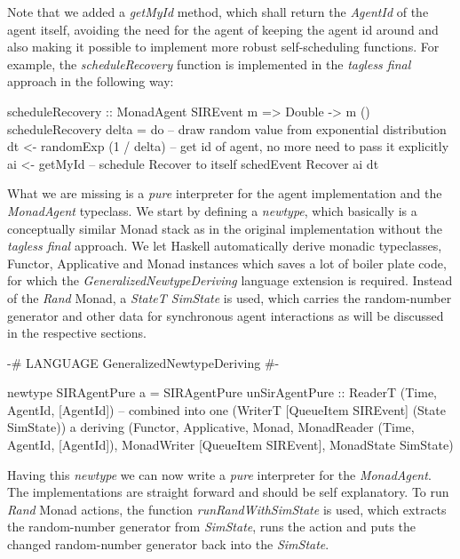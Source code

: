 Note that we added a \textit{getMyId} method, which shall return the \textit{AgentId} of the agent itself, avoiding the need for the agent of keeping the agent id around and also making it possible to implement more robust self-scheduling functions. For example, the \textit{scheduleRecovery} function is implemented in the \textit{tagless final} approach in the following way:

\begin{HaskellCode}
scheduleRecovery :: MonadAgent SIREvent m => Double -> m ()
scheduleRecovery delta = do
  -- draw random value from exponential distribution
  dt <- randomExp (1 / delta)
  -- get id of agent, no more need to pass it explicitly
  ai <- getMyId
  -- schedule Recover to itself
  schedEvent Recover ai dt
\end{HaskellCode}

What we are missing is a \textit{pure} interpreter for the agent implementation and the \textit{MonadAgent} typeclass. We start by defining a \textit{newtype}, which basically is a conceptually similar Monad stack as in the original implementation without the \textit{tagless final} approach. We let Haskell automatically derive monadic typeclasses, Functor, Applicative and Monad instances which saves a lot of boiler plate code, for which the \textit{GeneralizedNewtypeDeriving} language extension is required. Instead of the \textit{Rand} Monad, a \textit{StateT SimState} is used, which carries the random-number generator and other data  for synchronous agent interactions as will be discussed in the respective sections.

\begin{HaskellCode}
{-# LANGUAGE GeneralizedNewtypeDeriving #-}

newtype SIRAgentPure a = SIRAgentPure 
  { unSirAgentPure :: ReaderT (Time, AgentId, [AgentId]) -- combined into one
                        (WriterT [QueueItem SIREvent]
                          (State SimState)) a}
  deriving (Functor, Applicative, Monad, 
            MonadReader (Time, AgentId, [AgentId]),
            MonadWriter [QueueItem SIREvent],  
            MonadState SimState)
\end{HaskellCode}

Having this \textit{newtype} we can now write a \textit{pure} interpreter for the \textit{MonadAgent}. The implementations are straight forward and should be self explanatory. To run \textit{Rand} Monad actions, the function \textit{runRandWithSimState} is used, which extracts the random-number generator from \textit{SimState}, runs the action and puts the changed random-number generator back into the \textit{SimState}.


